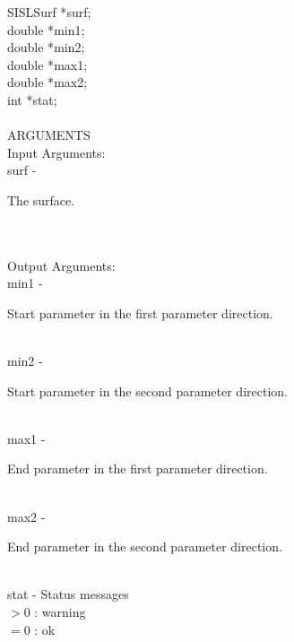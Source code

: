                 \>\>    SISLSurf        \>      *{\fov surf};\\
                \>\>    double  \>      *{\fov min1};\\
                \>\>    double  \>      *{\fov min2};\\
                \>\>    double  \>      *{\fov max1};\\
                \>\>    double  \>      *{\fov max2};\\
                \>\>    int     \>      *{\fov stat};\\
\\
ARGUMENTS\\
        \>Input Arguments:\\
        \>\>    {\fov surf}\> - \>      \begin{minipg2}
                                The surface.
                                \end{minipg2}\\
\\
        \>Output Arguments:\\
        \>\>    {\fov min1}\> - \>      \begin{minipg2}
                                Start parameter in the first parameter direction.
                                \end{minipg2}\\
        \>\>    {\fov min2}\> - \>      \begin{minipg2}
                                Start parameter in the second parameter direction.
                                \end{minipg2}\\
        \>\>    {\fov max1}\> - \>      \begin{minipg2}
                                End parameter in the first parameter direction.
                                \end{minipg2}\\
        \>\>    {\fov max2}\> - \>      \begin{minipg2}
                                End parameter in the second parameter direction.
                                \end{minipg2}\\
        \>\>    {\fov stat}     \> - \> Status messages\\
                \>\>\>\>\>              $> 0$   : warning\\
                \>\>\>\>\>              $= 0$   : ok\\
